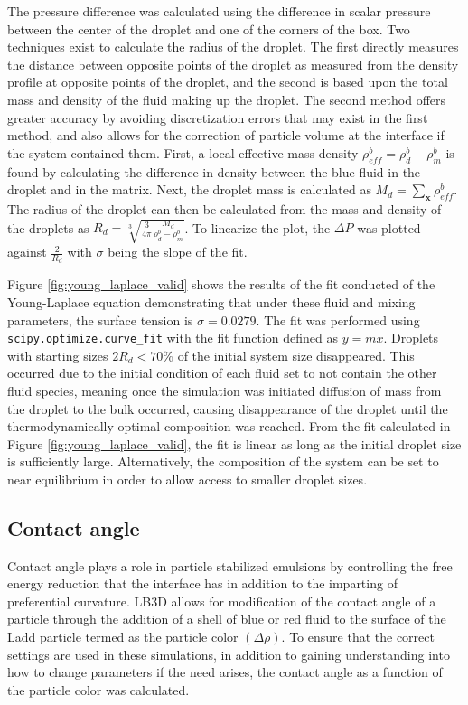 The pressure difference was calculated using the difference in scalar pressure between the center of the droplet and 
one of the corners of the box. Two techniques exist to calculate the radius of the droplet. The first directly measures 
the distance between opposite points of the droplet as measured from the density profile at opposite points of the droplet, 
and the second is based upon the total mass and density of the fluid making up the droplet. The second method offers greater 
accuracy by avoiding discretization errors that may exist in the first method, and also allows for the correction of 
particle volume at the interface if the system contained them. First, a local effective mass density 
$\rho^b_{eff} = \rho^{b}_{d} - \rho^{b}_{m}$ is found by calculating the difference in density between the blue 
fluid in the droplet and in the matrix. Next, the droplet mass is calculated as $M_d = \sum_{\mathbf{x}}{\rho_{eff}^{b}}$. 
The radius of the droplet can then be calculated from the mass and density of the droplets as $R_d = \sqrt[3]{\frac{3}{4\pi} 
\frac{M_d}{\rho^b_d - \rho^b_m}}$. To linearize the plot, the $\Delta P$ was plotted against $\frac{2}{R_d}$ with 
$\sigma$ being the slope of the fit.

Figure \ref{fig:young_laplace_valid} shows the results of the fit conducted of the Young-Laplace equation demonstrating 
that under these fluid and mixing parameters, the surface tension is $\sigma = 0.0279$. The fit was performed using 
\texttt{scipy.optimize.curve\_fit} with the fit function defined as $y = mx$. Droplets with starting sizes $2R_d < 70\%$ 
of the initial system size disappeared. This occurred due to the initial condition of each fluid set to not contain the 
other fluid species, meaning once the simulation was initiated diffusion of mass from the droplet to the bulk occurred, 
causing disappearance of the droplet until the thermodynamically optimal composition was reached. From the fit calculated 
in Figure \ref{fig:young_laplace_valid}, the fit is linear as long as the initial droplet size is sufficiently large. 
Alternatively, the composition of the system can be set to near equilibrium in order to allow access to smaller droplet 
sizes.

\subsection{Contact angle}
\label{section:model_contact_angle}

Contact angle plays a role in particle stabilized emulsions by controlling the free energy reduction that the interface 
has in addition to the imparting of preferential curvature. LB3D allows for modification of the contact angle of a 
particle through the addition of a shell of blue or red fluid to the surface of the Ladd particle termed as the particle 
color $(\Delta \rho)$. \cite{jansen_bijels_2011, gunther_lattice_2013} To ensure that the correct settings are used in 
these simulations, in addition to gaining understanding into how to change parameters if the need arises, the contact 
angle as a function of the particle color was calculated.


